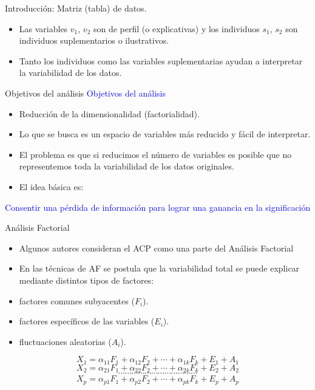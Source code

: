 \documentclass[
  spanish,
  ignorenonframetext,
]{beamer}
\newcommand\blue[1]{\textcolor{blue}{#1}}
\begin{document}
\begin{frame}{Introducción: Matriz (tabla) de datos.}
\protect\hypertarget{introducciuxf3n-matriz-tabla-de-datos.-1}{}
\begin{itemize}
\item
  Las variables \(v_1\), \(v_2\) son de perfil (o explicativas) y los
  individuos \(s_1\), \(s_2\) son individuos suplementarios o
  ilustrativos.
\item
  Tanto los individuos como las variables suplementarias ayudan a
  interpretar la variabilidad de los datos.
\end{itemize}
\end{frame}

\begin{frame}{Objetivos del análisis}
\protect\hypertarget{objetivos-del-anuxe1lisis}{}
\blue{Objetivos del  análisis}

\begin{itemize}
\item
  Reducción de la dimensionalidad (factorialidad).
\item
  Lo que se busca es un espacio de variables más reducido y fácil de
  interpretar.
\item
  El problema es que si reducimos el número de variables es posible que
  no representemos toda la variabilidad de los datos originales.
\item
  El idea básica es:
\end{itemize}

\blue{Consentir una pérdida de  información para lograr una
ganancia en la significación}
\end{frame}

\begin{frame}{Análisis Factorial}
\protect\hypertarget{anuxe1lisis-factorial}{}
\begin{itemize}
\item
  Algunos autores consideran el ACP como una parte del Análisis
  Factorial
\item
  En las técnicas de AF se postula que la variabilidad total se puede
  explicar mediante distintos tipos de factores:
\item
  factores comunes subyacentes (\(F_i\)).
\item
  factores específicos de las variables (\(E_i\)).
\item
  fluctuaciones aleatorias (\(A_i\)).
\end{itemize}

\[X_1=\alpha_{1 1} F_1+ \alpha_{1 2} F_2+\cdots +\alpha_{1 k} F_k+ E_1+ A_1\]
\[X_2=\alpha_{2 1} F_1+ \alpha_{2 2} F_2+\cdots +\alpha_{2 k} F_k+ E_2+ A_2\]
\[\cdots\cdots\cdots\cdots\cdots\cdots\cdots\cdots\cdots\cdots\cdots\cdots\]
\[X_p=\alpha_{p 1} F_1+ \alpha_{p 2} F_2+\cdots +\alpha_{p k} F_k+ E_p+ A_p\]
\end{frame}
\end{document}

